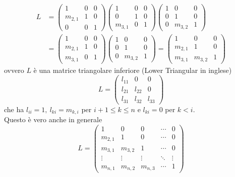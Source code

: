 \documentclass[12pt,a4paper]{article}
\begin{document}
    \[
    \begin{split}
        L &=
        \begin{pmatrix}
        1 & 0 & 0 \\
        m_{2,1} & 1 & 0 \\
        0 & 0 & 1
        \end{pmatrix}
        \begin{pmatrix}
        1 & 0 & 0 \\
        0 & 1 & 0 \\
        m_{3,1} & 0 & 1
        \end{pmatrix}
        \begin{pmatrix}
        1 & 0 & 0 \\
        0 & 1 & 0 \\
        0 & m_{3,2} & 1
        \end{pmatrix} \\
        &=
        \begin{pmatrix}
        1 & 0 & 0 \\
        m_{2,1} & 1 & 0 \\
        m_{3,1} & 0 & 1
        \end{pmatrix}
        \begin{pmatrix}
        1 & 0 & 0 \\
        0 & 1 & 0 \\
        0 & m_{3,2} & 1
        \end{pmatrix}
        =
        \begin{pmatrix}
        1 & 0 & 0 \\
        m_{2,1} & 1 & 0 \\
        m_{3,1} & m_{3,2} & 1
        \end{pmatrix}
    \end{split}
    \]
    ovvero $L$ è una matrice triangolare inferiore (Lower Triangular in inglese)
    \[
    L =
    \begin{pmatrix}
    l_{11} & 0 & 0 \\
    l_{21} & l_{22} & 0 \\
    l_{31} & l_{32} & l_{33}
    \end{pmatrix}
    \]
    che ha $l_{ii} = 1, \ l_{ki} = m_{k,i}$ per $i+1 \le k \le n$ e $l_{ki} = 0$ per $k<i$. \\
Questo è vero anche in generale
\[
L=
\begin{pmatrix}
1 & 0 & 0 & \cdots & 0 \\
m_{2,1} & 1 & 0 & \cdots & 0 \\
m_{3,1} & m_{3,2} & 1 & \cdots & 0 \\
\vdots & \vdots & \vdots & \ddots & \vdots \\
m_{n,1} & m_{n,2} & m_{n,3} & \cdots & 1
\end{pmatrix}
\]
\end{document}
